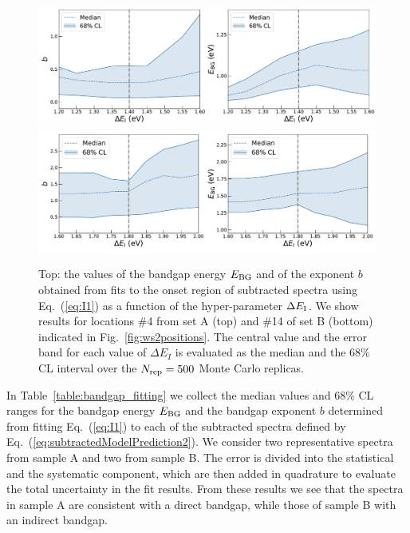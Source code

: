 {\begin{figure}[t]
\begin{centering}
  \includegraphics[width=0.6\linewidth]{plots/Stabilityplots_sp4.pdf}
  \includegraphics[width=0.6\linewidth]{plots/Stability_plots_sp14.pdf} 
  \caption{Top: the values of the bandgap energy $E_{\rm BG}$ and of the exponent $b$
  obtained from fits to the onset
  region of subtracted spectra using Eq.~(\ref{eq:I1}) as a function
  of the hyper-parameter $\Delta E_{\rm I}$.
  We show results for locations \#4 from set A (top)
  and \#14 of set B (bottom) indicated in Fig.~\ref{fig:ws2positions}.
  The central value and the error band for each value of $\Delta E_I$ is evaluated
  as the median and the 68\% CL interval over the $N_{\rm rep}=500$ Monte Carlo replicas.
  }
\label{fig:bvalues}
\end{centering}
\end{figure}

In Table~\ref{table:bandgap_fitting} we collect
 the median values and 68\% CL ranges for the bandgap energy $E_{\rm BG}$
 and the bandgap exponent $b$ determined from fitting Eq.~(\ref{eq:I1}) to each of the subtracted
 spectra defined by Eq.~(\ref{eq:subtractedModelPrediction2}).
 We consider two representative spectra from sample A and two
 from sample B. 
 The error is divided into the statistical and the systematic component, which are
 then added in quadrature to evaluate the total uncertainty in the fit results. 
 From these results we see that the spectra in sample A are consistent with a direct bandgap,
 while those of sample B with an indirect bandgap.

}

